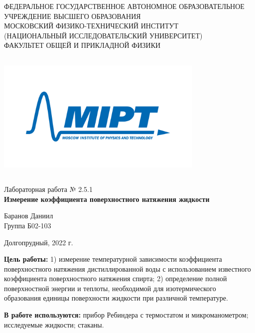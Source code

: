 \documentclass[a4paper,12pt]{article} %
\begin{document}
\begin{center}
	\footnotesize{ФЕДЕРАЛЬНОЕ ГОСУДАРСТВЕННОЕ АВТОНОМНОЕ ОБРАЗОВАТЕЛЬНОЕ 			УЧРЕЖДЕНИЕ ВЫСШЕГО ОБРАЗОВАНИЯ}\\
	\footnotesize{МОСКОВСКИЙ ФИЗИКО-ТЕХНИЧЕСКИЙ ИНСТИТУТ\\(НАЦИОНАЛЬНЫЙ 			ИССЛЕДОВАТЕЛЬСКИЙ УНИВЕРСИТЕТ)}\\
	\footnotesize{ФАКУЛЬТЕТ ОБЩЕЙ И ПРИКЛАДНОЙ ФИЗИКИ\\}
	\hfill \break
	\hfill \break
	\hfill \break
	\hfill \break
    \includegraphics[width=10cm,height=7cm,keepaspectratio]{mipt_eng_text_png.png}\\
    \hfill \break
	\hfill \break
	\hfill \break
	\hfill \break
	\large{Лабораторная работа № 2.5.1\\\textbf{Измерение коэффициента поверхностного натяжения жидкости}}\\
	\hfill \break
	\hfill \break
	\hfill \break
	\hfill \break
	\begin{flushright}
		Баранов Даниил\\
		Группа Б02-103
	\end{flushright}
	\hfill \break
	\hfill \break
	\hfill \break
\end{center}
\hfill \break
\hfill \break
\hfill \break
\hfill \break
\begin{center}
	Долгопрудный, 2022 г.
\end{center}
\thispagestyle{empty}
\newpage
	\textbf{Цель работы:} 1) измерение температурной зависимости  коэффициента поверхностного натяжения дистиллированной воды с использованием известного коэффициента поверхностного натяжения спирта; 2) определение полной поверхностной энергии  и теплоты, необходимой для изотермического образования единицы поверхности жидкости  при различной температуре.
	\hfill \break
	
	\textbf{В работе используются:} прибор  Ребиндера  с термостатом и микроманометром; исследуемые жидкости; стаканы.
	
\end{document}

